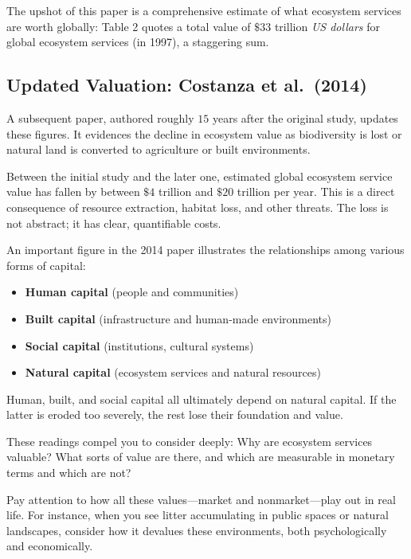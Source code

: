 \documentclass[
  10pt,
]{book}
\providecommand{\tightlist}{%
  \setlength{\itemsep}{0pt}\setlength{\parskip}{0pt}}
\begin{document}
The upshot of this paper is a comprehensive estimate of what ecosystem
services are worth globally: Table 2 quotes a total value of \(\$33\)
trillion \emph{US dollars} for global ecosystem services (in 1997), a
staggering sum.

\subsection{Updated Valuation: Costanza et
al.~(2014)}\label{updated-valuation-costanza-et-al.-2014}

A subsequent paper, authored roughly \(15\) years after the original
study, updates these figures. It evidences the decline in ecosystem
value as biodiversity is lost or natural land is converted to
agriculture or built environments.

Between the initial study and the later one, estimated global ecosystem
service value has fallen by between \(\$4\) trillion and \(\$20\)
trillion per year. This is a direct consequence of resource extraction,
habitat loss, and other threats. The loss is not abstract; it has clear,
quantifiable costs.

An important figure in the 2014 paper illustrates the relationships
among various forms of capital:

\begin{itemize}
\tightlist
\item
  \textbf{Human capital} (people and communities)
\item
  \textbf{Built capital} (infrastructure and human-made environments)
\item
  \textbf{Social capital} (institutions, cultural systems)
\item
  \textbf{Natural capital} (ecosystem services and natural resources)
\end{itemize}

Human, built, and social capital all ultimately depend on natural
capital. If the latter is eroded too severely, the rest lose their
foundation and value.

These readings compel you to consider deeply: Why are ecosystem services
valuable? What sorts of value are there, and which are measurable in
monetary terms and which are not?

Pay attention to how all these values---market and nonmarket---play out
in real life. For instance, when you see litter accumulating in public
spaces or natural landscapes, consider how it devalues these
environments, both psychologically and economically.
\end{document}
